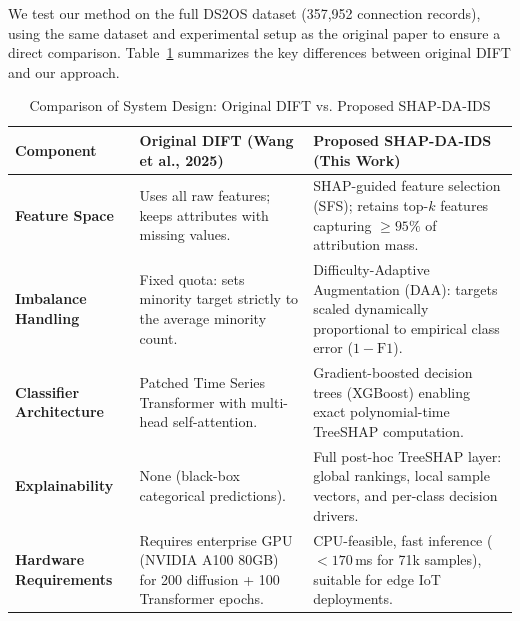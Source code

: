 We test our method on the full DS2OS dataset (357,952 connection records), using the same dataset and experimental setup as the original paper to ensure a direct comparison. Table~\ref{tab:contribution_comparison} summarizes the key differences between original DIFT and our approach.

\begin{table}[!t]
\centering
\caption{Comparison of System Design: Original DIFT vs. Proposed SHAP-DA-IDS}
\label{tab:contribution_comparison}
\begin{tabular}{p{3.2cm}p{6.8cm}p{6.8cm}}
\toprule
\textbf{Component} & \textbf{Original DIFT (Wang et al., 2025)~\cite{wang2025dift}} & \textbf{Proposed SHAP-DA-IDS (This Work)} \\ \midrule
\textbf{Feature Space} & Uses all raw features; keeps attributes with missing values. & SHAP-guided feature selection (SFS); retains top-$k$ features capturing $\ge 95\%$ of attribution mass. \\
\textbf{Imbalance Handling} & Fixed quota: sets minority target strictly to the average minority count. & Difficulty-Adaptive Augmentation (DAA): targets scaled dynamically proportional to empirical class error ($1 - \text{F1}$). \\
\textbf{Classifier Architecture} & Patched Time Series Transformer with multi-head self-attention. & Gradient-boosted decision trees (XGBoost) enabling exact polynomial-time TreeSHAP computation. \\
\textbf{Explainability} & None (black-box categorical predictions). & Full post-hoc TreeSHAP layer: global rankings, local sample vectors, and per-class decision drivers. \\
\textbf{Hardware Requirements} & Requires enterprise GPU (NVIDIA A100 80GB) for 200 diffusion + 100 Transformer epochs. & CPU-feasible, fast inference ($< 170$\,ms for 71k samples), suitable for edge IoT deployments. \\ \bottomrule
\end{tabular}
\end{table}
